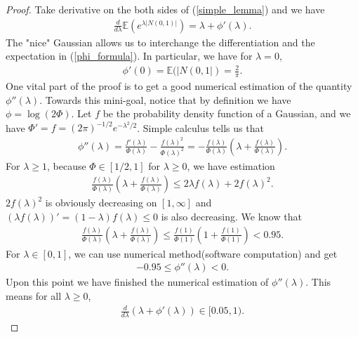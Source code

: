 \documentclass[10pt]{article}
\newcommand{\e}{\mathbb{E}}
\newenvironment{Proof of lemma}{\noindent{\bf Proof of Lemma}}{\hfill$\Box$\newline}
\newenvironment{Proof of claim}{\noindent{\bf Proof of claim}}{\hfill$\Box$\newline}
\newenvironment{Proof of theorem}{\noindent{\bf Proof of Theorem}}{\hfill\scriptsize{$\Box$}\newline}
\newenvironment{Proof of theorems}{\noindent{\bf Proof of Theorems}}{\hfill$\Box$\newline}
\newenvironment{Proof of proposition}{\noindent{\bf Proof of Proposition}}{\hfill$\Box$\newline}
\newenvironment{Proof of propositions}{\noindent{\bf Proof of Propositions}}{\hfill$\Box$\newline}
\newenvironment{Proof of exercise}{\noindent{\it Proof of Exercise:}}{\hfill$\Box$}
\numberwithin{equation}{section}
\begin{document}
\begin{proof}
    Take derivative on the both sides of (\ref{simple_lemma}) and we have
    \begin{align} \label{phi_formula}
        \frac{d}{d\lambda} \e(e^{\lambda|N(0,1)|}) = \lambda + \phi'(\lambda).
    \end{align}
    The "nice" Gaussian allows us to interchange the differentiation and the expectation in (\ref{phi_formula}). In particular, we have for $\lambda = 0$,
    \begin{align}
        \phi'(0) = \e (|N(0,1|) = \frac{2}{\pi}.
    \end{align}
    One vital part of the proof is to get a good numerical estimation of the quantity $\phi''(\lambda)$. Towards this mini-goal, notice that by definition we have $\phi = \log(2\Phi)$. Let $f$ be the probability density function of a Gaussian, and we have $\Phi' = f = (2 \pi)^{-1/2}e^{-\lambda^2/2}$. Simple calculus tells us that
    \begin{align} \label{phi_doubleprime_esti}
        \phi''(\lambda) = \frac{f'(\lambda)}{\Phi(\lambda)} - \frac{f(\lambda)^2}{\Phi(\lambda)^2} = -\frac{f(\lambda)}{\Phi(\lambda)}\left(\lambda+\frac{f(\lambda)}{\Phi(\lambda)}\right).
    \end{align}
    For $\lambda \geq 1$, because $\Phi \in [1/2,1]$ for $\lambda \geq 0$, we have estimation
    \begin{align}
        \frac{f(\lambda)}{\Phi(\lambda)}\left(\lambda+\frac{f(\lambda)}{\Phi(\lambda)}\right) \leq 2\lambda f(\lambda)+2f(\lambda)^2.
    \end{align}
    $2f(\lambda)^2$ is obviously decreasing on $[1,\infty]$ and $(\lambda f(\lambda))' = (1-\lambda)f(\lambda)\leq 0$ is also decreasing. We know that
    \begin{align}
        \frac{f(\lambda)}{\Phi(\lambda)}\left(\lambda+\frac{f(\lambda)}{\Phi(\lambda)}\right) \leq \frac{f(1)}{\Phi(1)}\left(1+\frac{f(1)}{\Phi(1)}\right) < 0.95.
    \end{align}
    For $\lambda \in [0,1]$, we can use numerical method(software computation) and get 
    \begin{align}
        -0.95 \leq \phi''(\lambda) < 0.
    \end{align}
    Upon this point we have finished the numerical estimation of $\phi''(\lambda)$.
    This means for all $\lambda \geq 0$,
    \begin{align} \label{phi_deriv_range}
        \frac{d}{d\lambda}(\lambda + \phi'(\lambda)) \in [0.05,1).

\end{align}
\end{proof}
\end{document}
